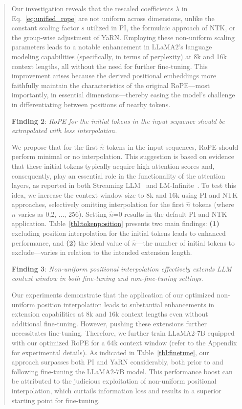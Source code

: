\begin{abstract}
Our investigation reveals that the rescaled coefficients $\lambda$ in Eq.~\ref{eq:unified_rope} are not uniform across dimensions, unlike the constant scaling factor $s$ utilized in PI, the formulaic approach of NTK, or the group-wise adjustment of YaRN. Employing these non-uniform scaling parameters leads to a notable enhancement in LLaMA2’s language modeling capabilities (specifically, in terms of perplexity) at 8k and 16k context lengths, all without the need for further fine-tuning. This improvement arises because the derived positional embeddings more faithfully maintain the characteristics of the original RoPE—most importantly, in essential dimensions—thereby easing the model's challenge in differentiating between positions of nearby tokens.

\textbf{Finding 2}: \textit{RoPE for the initial tokens in the input sequence should be extrapolated with less interpolation.} 

We propose that for the first $\hat{n}$ tokens in the input sequences, RoPE should perform minimal or no interpolation. This suggestion is based on evidence that these initial tokens typically acquire high attention scores and, consequently, play an essential role in the functionality of the attention layers, as reported in both Streaming LLM~\cite{streamingllm} and LM-Infinite~\cite{han2023lminfinite}. To test this idea, we increase the context window size to 8k and 16k using PI and NTK approaches, selectively omitting interpolation for the first $\hat n$ tokens (where $\hat n$ varies as 0,2, ..., 256). Setting $\hat n$=0 results in the default PI and NTK application. Table~\ref{tbl:tokenposition} presents two main findings: \textbf{(1)} excluding position interpolation for the initial tokens leads to enhanced performance, and \textbf{(2)} the ideal value of $\hat n$—the number of initial tokens to exclude—varies in relation to the intended extension length.

\textbf{Finding 3}: \textit{Non-uniform positional interpolation effectively extends LLM context window in both fine-tuning and non-fine-tuning settings.} 

Our experiments demonstrate that the application of our optimized non-uniform position interpolation leads to substantial enhancements in extension capabilities at 8k and 16k context lengths even without additional fine-tuning. However, pushing these extensions further necessitates fine-tuning. Therefore, we further train LLaMA2-7B equipped with our optimized RoPE for a 64k context window (refer to the Appendix for experimental details). As indicated in Table~\ref{tbl:finetune}, our approach surpasses both PI and YaRN considerably, both prior to and following fine-tuning the LLaMA2-7B model. This performance boost can be attributed to the judicious exploitation of non-uniform positional interpolation, which curtails information loss and results in a superior starting point for fine-tuning.


\end{abstract}
